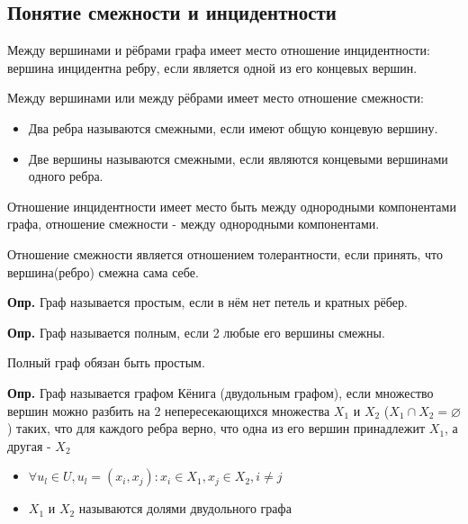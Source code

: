 \documentclass[10pt]{article}
\begin{document}
\subsection*{Понятие смежности и инцидентности}
\par Между вершинами и рёбрами графа имеет место отношение инцидентности: вершина инцидентна ребру, если является одной из его концевых вершин.
\par Между вершинами или между рёбрами имеет место отношение смежности:
\begin{itemize}
    \item Два ребра называются смежными, если имеют общую концевую вершину.
    \item Две вершины называются смежными, если являются концевыми вершинами одного ребра.
\end{itemize}
\par Отношение инцидентности имеет место быть между однородными компонентами графа, отношение смежности - между однородными компонентами.
\par Отношение смежности является отношением толерантности, если принять, что вершина(ребро) смежна сама себе.

\par\textbf{Опр.} Граф называется простым, если в нём нет петель и кратных рёбер.
\par\textbf{Опр.} Граф называется полным, если 2 любые его вершины смежны.
\par Полный граф обязан быть простым.

\par\textbf{Опр.} Граф называется графом Кёнига (двудольным графом), если множество вершин можно разбить на 2 непересекающихся множества $X_{1}$ и $X_{2}$ ($X_{1} \cap X_{2} = \varnothing$) таких, что для каждого ребра верно, что одна из его вершин принадлежит $X_{1}$, а другая - $X_{2}$
\begin{itemize}
    \item $\forall u_{l} \in U, u_{l} = (x_{i}, x_{j}): x_{i} \in X_{1}, x_{j} \in X_{2}, i \not= j$
    \item $X_{1}$ и $X_{2}$ называются долями двудольного графа
\end{itemize}
\end{document}
